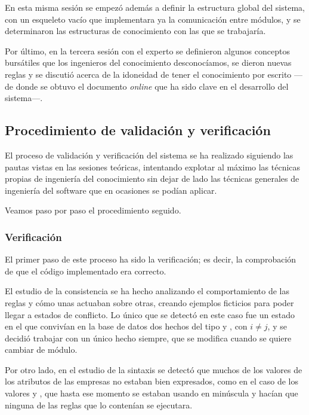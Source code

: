 \documentclass[a4paper, 11pt, titlepage]{article}
\begin{document}
    En esta misma sesión se empezó además a definir la estructura global del sistema, con un esqueleto vacío que implementara ya la comunicación entre módulos, y se determinaron las estructuras de conocimiento con las que se trabajaría.

    Por último, en la tercera sesión con el experto se definieron algunos conceptos bursátiles que los ingenieros del conocimiento desconocíamos, se dieron nuevas reglas y se discutió acerca de la idoneidad de tener el conocimiento por escrito ---de donde se obtuvo el documento \emph{online} que ha sido clave en el desarrollo del sistema---.

    \subsection{Procedimiento de validación y verificación}

    El proceso de validación y verificación del sistema se ha realizado siguiendo las pautas vistas en las sesiones teóricas, intentando explotar al máximo las técnicas propias de ingeniería del conocimiento sin dejar de lado las técnicas generales de ingeniería del software que en ocasiones se podían aplicar.

    Veamos paso por paso el procedimiento seguido.

    \subsubsection*{Verificación}
    El primer paso de este proceso ha sido la verificación; es decir, la comprobación de que el código implementado era correcto.

    El estudio de la consistencia se ha hecho analizando el comportamiento de las reglas y cómo unas actuaban sobre otras, creando ejemplos ficticios para poder llegar a estados de conflicto. Lo único que se detectó en este caso fue un estado en el que convivían en la base de datos dos hechos del tipo  y , con $i \neq j$, y se decidió trabajar con un único hecho siempre, que se modifica cuando se quiere cambiar de módulo.

    Por otro lado, en el estudio de la sintaxis se detectó que muchos de los valores de los atributos de las empresas no estaban bien expresados, como en el caso de los valores  y , que hasta ese momento se estaban usando en minúscula y hacían que ninguna de las reglas que lo contenían se ejecutara.
\end{document}

